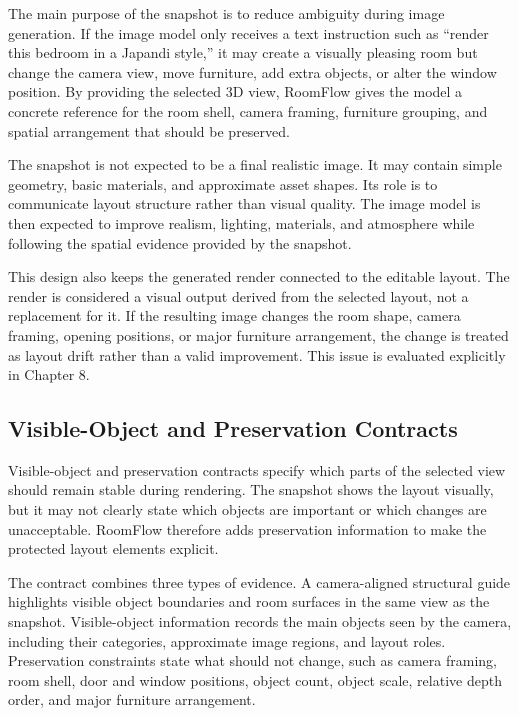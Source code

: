 The main purpose of the snapshot is to reduce ambiguity during image generation. If the image model only receives a text instruction such as ``render this bedroom in a Japandi style,'' it may create a visually pleasing room but change the camera view, move furniture, add extra objects, or alter the window position. By providing the selected 3D view, RoomFlow gives the model a concrete reference for the room shell, camera framing, furniture grouping, and spatial arrangement that should be preserved.

The snapshot is not expected to be a final realistic image. It may contain simple geometry, basic materials, and approximate asset shapes. Its role is to communicate layout structure rather than visual quality. The image model is then expected to improve realism, lighting, materials, and atmosphere while following the spatial evidence provided by the snapshot.

This design also keeps the generated render connected to the editable layout. The render is considered a visual output derived from the selected layout, not a replacement for it. If the resulting image changes the room shape, camera framing, opening positions, or major furniture arrangement, the change is treated as layout drift rather than a valid improvement. This issue is evaluated explicitly in Chapter 8.

\subsection{Visible-Object and Preservation Contracts}\label{subsec:problem2-technique-contract}

Visible-object and preservation contracts specify which parts of the selected view should remain stable during rendering. The snapshot shows the layout visually, but it may not clearly state which objects are important or which changes are unacceptable. RoomFlow therefore adds preservation information to make the protected layout elements explicit.

The contract combines three types of evidence. A camera-aligned structural guide highlights visible object boundaries and room surfaces in the same view as the snapshot. Visible-object information records the main objects seen by the camera, including their categories, approximate image regions, and layout roles. Preservation constraints state what should not change, such as camera framing, room shell, door and window positions, object count, object scale, relative depth order, and major furniture arrangement.

